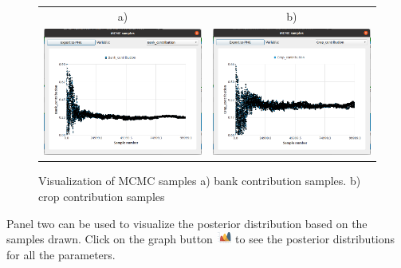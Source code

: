 \documentclass[12pt]{report}
\begin{document}
\begin{figure}[ht]
    \centering
    \begin{tabular}{c c}
        a) & b) \\
        \includegraphics[width=8cm]{Figures/MCMC_Samples_Bank.png} & \includegraphics[width=8cm]{Figures/MCMC_samples_crop.png}
    \end{tabular}
    \caption{Visualization of MCMC samples a) bank contribution samples. b) crop contribution samples}
    \label{fig:MCMC-samples}
\end{figure}
\FloatBarrier

Panel two can be used to visualize the posterior distribution based on the samples drawn. Click on the graph button \includegraphics[width=0.5cm]{Figures/Graph.png} to see the posterior distributions for all the parameters. 
\end{document}
